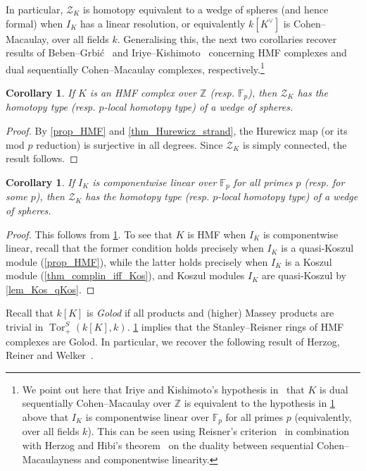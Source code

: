\documentclass[a4paper,10pt]{amsart}
\newtheorem{corollary}[theorem]{Corollary}
\theoremstyle{definition}
\theoremstyle{remark}
\DeclareMathOperator{\Tor}{Tor}
\begin{document}
In particular, $\mathcal{Z}_K$ is homotopy equivalent to a wedge of spheres (and hence formal) when $I_K$ has a linear resolution, or equivalently $k[K^\vee]$ is Cohen--Macaulay, over all fields $k$. Generalising this, the next two corollaries recover results of Beben--Grbi\'c~\cite[Proposition~3.18]{BG} and Iriye--Kishimoto~\cite[Corollary~1.5]{IK19} concerning HMF complexes and dual sequentially Cohen--Macaulay complexes, respectively.\footnote{We point out here that Iriye and Kishimoto's hypothesis in~\cite[Corollary~1.5]{IK19} that $K$ is dual sequentially Cohen--Macaulay over $\mathbb{Z}$ is equivalent to the hypothesis in \cref{cor_compwise} above that $I_K$ is componentwise linear over $\mathbb{F}_p$ for all primes $p$ (equivalently, over all fields $k$). This can be seen using Reisner's criterion~\cite{Re} in combination with Herzog and Hibi's theorem~\cite[Theorem 2.1]{HH} on the duality between sequential Cohen--Macaulayness and componentwise linearity.}

\begin{corollary} \label{cor_HMF}
If $K$ is an HMF complex over $\mathbb{Z}$ (resp. $\mathbb{F}_p$), then $\mathcal{Z}_K$ has the homotopy type (resp. $p$-local homotopy type) of a wedge of spheres.
\end{corollary}

\begin{proof}
By \cref{prop_HMF} and \cref{thm_Hurewicz_strand}, the Hurewicz map (or its mod $p$ reduction) is surjective in all degrees. Since $\mathcal{Z}_K$ is simply connected, the result follows.
\end{proof}

\begin{corollary} \label{cor_compwise}
If $I_K$ is componentwise linear over $\mathbb{F}_p$ for all primes $p$ (resp. for some $p$), then $\mathcal{Z}_K$ has the homotopy type (resp. $p$-local homotopy type) of a wedge of spheres.
\end{corollary}

\begin{proof}
This follows from \cref{cor_HMF}. To see that $K$ is HMF when $I_K$ is componentwise linear, recall that the former condition holds precisely when $I_K$ is a quasi-Koszul module (\cref{prop_HMF}), while the latter holds precisely when $I_K$ is a Koszul module (\cref{thm_complin_iff_Kos}), and Koszul modules $I_K$ are quasi-Koszul by \cref{lem_Kos_qKos}.
\end{proof}

Recall that $k[K]$ is \emph{Golod} if all products and (higher) Massey products are trivial in $\Tor^S_+(k[K],k)$. \cref{cor_HMF} implies that the Stanley--Reisner rings of HMF complexes are Golod. In particular, we recover the following result of Herzog, Reiner and Welker~\cite{HRW}.
\end{document}
